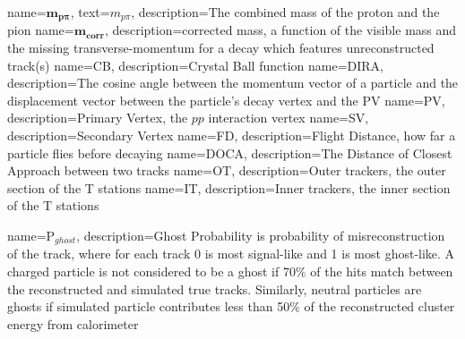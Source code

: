                 {
                    name=$\mathbold{m_{p\pi}}$,
                     text=$m_{p\pi}$,
                   description={The combined mass of the proton and the pion}
                 }
                 {
                   name=$\mathbold{m_{corr}}$,
                   description={corrected mass, a function of the visible mass and the missing transverse-momentum for a decay which features unreconstructed track(s)}
                 }                 
                 {
                   name=CB,
                   description={Crystal Ball function}
                 }                 
                 {
                   name=DIRA,
                   description={The cosine angle between the momentum vector of a particle and the displacement vector between the particle's decay vertex and the \Gls{PV}}
                 }
                 {
                   name=PV,
                   description={Primary Vertex, the $pp$ interaction vertex}
                 }
                 {
                   name=SV,
                   description={Secondary Vertex}
                 }
                 {
                   name=FD,
                   description={Flight Distance, how far a particle flies before decaying}
                 }                                                                      
                 {
                   name=DOCA,
                   description={The Distance of Closest Approach between two tracks} 
                }
                 {
                   name=OT,
                   description={Outer trackers, the outer section of the T stations} 
                }
                 {
                   name=IT,
                   description={Inner trackers, the inner section of the T stations} 
                }
                
                 {
                   name=P$_{ghost}$,
                   description={Ghost Probability is probability of misreconstruction of the track, where for each track 0 is most signal-like and 1 is most ghost-like. A charged particle is not considered to be a ghost if 70$\%$ of the hits match between the reconstructed and simulated true tracks. Similarly, neutral particles are ghosts if simulated particle contributes less than 50$\%$ of the reconstructed cluster energy from calorimeter} 
                }                

